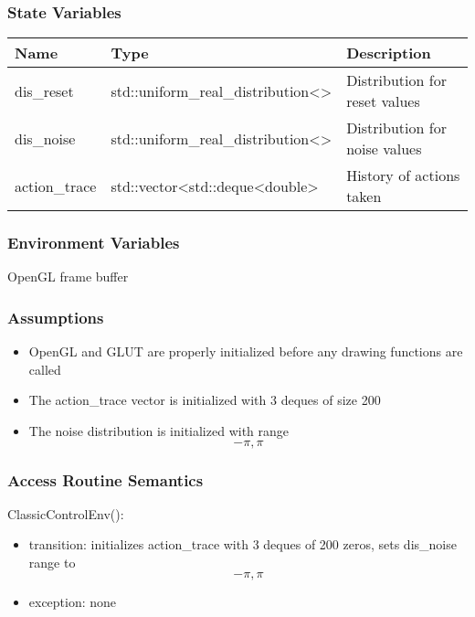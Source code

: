 \documentclass[12pt, titlepage]{article}
\begin{document}
\subsubsection{State Variables}
\begin{center}
  \begin{tabular}{p{4cm} p{6cm} p{4cm}}
    \hline
    \textbf{Name} & \textbf{Type} & \textbf{Description} \\
    \hline
    dis\_reset & std::uniform\_real\_distribution\textless \textgreater & Distribution for reset values \\
    \hline
    dis\_noise & std::uniform\_real\_distribution\textless \textgreater & Distribution for noise values \\
    \hline
    action\_trace & std::vector\textless std::deque\textless double\textgreater & History of actions taken \\
    \hline
  \end{tabular}
\end{center}

\subsubsection{Environment Variables}
OpenGL frame buffer

\subsubsection{Assumptions}
\begin{itemize}
  \item OpenGL and GLUT are properly initialized before any drawing functions are called  
  \item The action\_trace vector is initialized with 3 deques of size 200
  \item The noise distribution is initialized with range \[-\pi, \pi\]

\end{itemize}

\subsubsection{Access Routine Semantics}

\noindent ClassicControlEnv():
\begin{itemize}
  \item transition: initializes action\_trace with 3 deques of 200 zeros, sets dis\_noise range to\[-\pi, \pi\]
  
  \item exception: none

\end{itemize}
\end{document}
